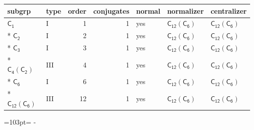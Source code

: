 \documentclass[10pt,a4paper]{article}
\newcommand{\needspace}[1]{\par\penalty-100\begingroup\dimen0=#1\relax\dimen2=\pagegoal
  \advance\dimen2-\pagetotal\ifdim\dimen0>\dimen2\relax\ifdim\dimen2>0pt\vfil\break\fi\fi
  \endgroup}
\numberwithin{equation}{section}
\newcommand{\grp}[1]{\mathsf{#1}}
\begin{document}
{\small\begin{longtable}{@{}llrrlll@{}}\toprule
subgrp & type & order & conjugates & normal & normalizer & centralizer\\\midrule\endhead
\bottomrule\endfoot\endlastfoot
\href{../../../rotation/data/pdf/C1.pdf}{$\grp{C_{1}}$} & I & 1 & 1 & yes & \href{C12-C6.pdf}{$\grp{C_{12}}(\grp{C_{6}})$} & \href{C12-C6.pdf}{$\grp{C_{12}}(\grp{C_{6}})$}\\*
\href{../../../rotation/data/pdf/C2.pdf}{$\grp{C_{2}}$} & I & 2 & 1 & yes & \href{C12-C6.pdf}{$\grp{C_{12}}(\grp{C_{6}})$} & \href{C12-C6.pdf}{$\grp{C_{12}}(\grp{C_{6}})$}\\*
\href{../../../rotation/data/pdf/C3.pdf}{$\grp{C_{3}}$} & I & 3 & 1 & yes & \href{C12-C6.pdf}{$\grp{C_{12}}(\grp{C_{6}})$} & \href{C12-C6.pdf}{$\grp{C_{12}}(\grp{C_{6}})$}\\*
\href{C4-C2.pdf}{$\grp{C_{4}}(\grp{C_{2}})$} & III & 4 & 1 & yes & \href{C12-C6.pdf}{$\grp{C_{12}}(\grp{C_{6}})$} & \href{C12-C6.pdf}{$\grp{C_{12}}(\grp{C_{6}})$}\\*
\href{../../../rotation/data/pdf/C6.pdf}{$\grp{C_{6}}$} & I & 6 & 1 & yes & \href{C12-C6.pdf}{$\grp{C_{12}}(\grp{C_{6}})$} & \href{C12-C6.pdf}{$\grp{C_{12}}(\grp{C_{6}})$}\\*
\href{C12-C6.pdf}{$\grp{C_{12}}(\grp{C_{6}})$} & III & 12 & 1 & yes & \href{C12-C6.pdf}{$\grp{C_{12}}(\grp{C_{6}})$} & \href{C12-C6.pdf}{$\grp{C_{12}}(\grp{C_{6}})$}\\
\bottomrule\end{longtable}}
\needspace{103pt}
\end{document}
